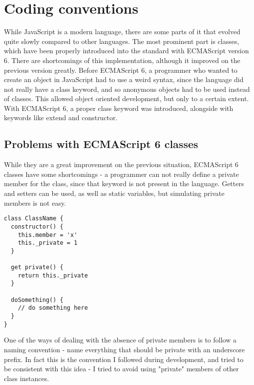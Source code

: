 \chapter{Coding conventions}\label{sect:Coding}
While JavaScript is a modern language, there are some parts of it that evolved quite slowly compared to other languages. The most prominent part is classes, which have been properly introduced into the standard with ECMAScript version 6. There are shortcomings of this implementation, although it improved on the previous version greatly. Before ECMAScript 6, a programmer who wanted to create an object in JavaScript had to use a weird syntax, since the language did not really have a class keyword, and so anonymous objects had to be used instead of classes. This allowed object oriented development, but only to a certain extent. With ECMAScript 6, a proper class keyword was introduced, alongside with keywords like extend and constructor.
\section{Problems with ECMAScript 6 classes}
While they are a great improvement on the previous situation, ECMAScript 6 classes have some shortcomings - a programmer can not really define a private member for the class, since that keyword is not present in the language. Getters and setters can be used, as well as static variables, but simulating private members is not easy.

\begin{lstlisting}[frame=single,float=!ht,caption="A typical class"]
class ClassName {
  constructor() {
    this.member = 'x'
    this._private = 1
  }
  
  get private() {
    return this._private
  }
  
  doSomething() {
    // do something here
  }
}
\end{lstlisting}

One of the ways of dealing with the absence of private members is to follow a naming convention - name everything that should be private with an underscore prefix. In fact this is the convention I followed during development, and tried to be consistent with this idea - I tried to avoid using "private" members of other class instances.
